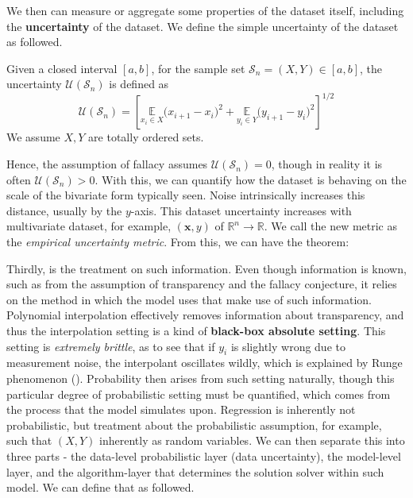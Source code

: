 \documentclass[
  journal=largetwo,
  year=2025,
  volume=37,
]{cup-journal}
\begin{document}
We then can measure or aggregate some properties of the dataset itself, including the \textbf{uncertainty} of the dataset. We define the simple uncertainty of the dataset as followed. 

\begin{definition}
    Given a closed interval $[a,b]$, for the sample set $\mathcal{S}_{n}=(X,Y)\in [a,b]$, the uncertainty $\mathcal{U}(\mathcal{S}_{n})$ is defined as 
    \begin{equation}
        \mathcal{U}(\mathcal{S}_{n}) = \left[ \underset{x_{i}\in X}{\mathbb{E}}\Big( x_{i+1} - x_{i} \Big)^{2} + \underset{y_{i}\in Y}{\mathbb{E}} \Big( y_{i+1}- y_{i} \Big)^{2} \right]^{1/2}
    \end{equation}
    We assume $X,Y$ are totally ordered sets. 
\end{definition}
Hence, the assumption of fallacy assumes $\mathcal{U}(\mathcal{S}_{n})=0$, though in reality it is often $\mathcal{U}(\mathcal{S}_{n})>0$. With this, we can quantify how the dataset is behaving on the scale of the bivariate form typically seen. Noise intrinsically increases this distance, usually by the $y$-axis. This dataset uncertainty increases with multivariate dataset, for example, $(\mathbf{x},y)$ of $\mathbb{R}^{n}\to\mathbb{R}$. We call the new metric as the \textit{empirical uncertainty metric}. From this, we can have the theorem:

\begin{theorem}
    
\end{theorem}

Thirdly, is the treatment on such information. Even though information is known, such as from the assumption of transparency and the fallacy conjecture, it relies on the method in which the model uses that make use of such information. Polynomial interpolation effectively removes information about transparency, and thus the interpolation setting is a kind of \textbf{black-box absolute setting}. This setting is \textit{extremely brittle}, as to see that if $y_{i}$ is slightly wrong due to measurement noise, the interpolant oscillates wildly, which is explained by Runge phenomenon (\cite{Runge1901,CorlessSevyeri2018,AMC2009RungeDivergence}). Probability then arises from such setting naturally, though this particular degree of probabilistic setting must be quantified, which comes from the process that the model simulates upon. Regression is inherently not probabilistic, but treatment about the probabilistic assumption, for example, such that $(X,Y)$ inherently as random variables. We can then separate this into three parts - the data-level probabilistic layer (data uncertainty), the model-level layer, and the algorithm-layer that determines the solution solver within such model. We can define that as followed. 
\end{document}
